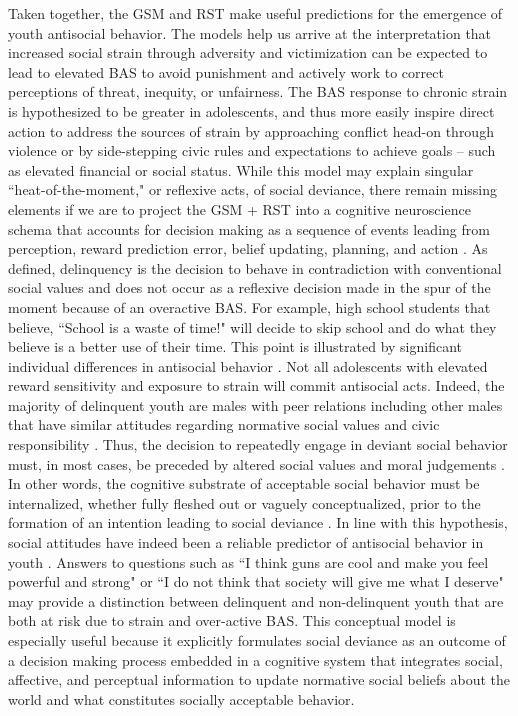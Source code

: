 \documentclass[utf8]{article}
\begin{document}
Taken together, the GSM and RST make useful predictions for the emergence of youth antisocial behavior. The models help us arrive at the interpretation that increased social strain through adversity and victimization can be expected to lead to elevated BAS to avoid punishment and actively work to correct perceptions of threat, inequity, or unfairness. The BAS response to chronic strain is hypothesized to be greater in adolescents, and thus more easily inspire direct action to address the sources of strain by approaching conflict head-on through violence or by side-stepping civic rules and expectations to achieve goals -- such as elevated financial or social status. While this model may explain singular  ``heat-of-the-moment," or reflexive acts, of social deviance, there remain missing elements if we are to project the GSM + RST into a cognitive neuroscience schema that accounts for decision making as a sequence of events leading from perception, reward prediction error, belief updating, planning, and action \citep{cosmides1997dissecting,cosmides2000socialreason,van2010interpersonal}. As defined, delinquency is the decision to behave in contradiction with conventional social values and does not occur as a reflexive decision made in the spur of the moment because of an overactive BAS. For example, high school students that believe, ``School is a waste of time!" will decide to skip school and do what they believe is a better use of their time. This point is illustrated by significant individual differences in antisocial behavior \citep{mazerolle1998gender}. Not all adolescents with elevated reward sensitivity and exposure to strain will commit antisocial acts. Indeed, the majority of delinquent youth are males with peer relations including other males that have similar attitudes regarding normative social values and civic responsibility \citep{mears1998explaining}. Thus, the decision to repeatedly engage in deviant social behavior must, in most cases, be preceded by altered social values and moral judgements \citep{stams2006moral}. In other words, the cognitive substrate of acceptable social behavior must be internalized, whether fully fleshed out or vaguely conceptualized, prior to the formation of an intention leading to social deviance \citep{pogarsky2018offender}. In line with this hypothesis, social attitudes have indeed been a reliable predictor of antisocial behavior in youth \citep{tarry2007attitudes}. Answers to questions such as ``I think guns are cool and make you feel powerful and strong" or ``I do not think that society will give me what I deserve" may provide a distinction between delinquent and non-delinquent youth that are both at risk due to strain and over-active BAS. This conceptual model is especially useful because it explicitly formulates social deviance as an outcome of a decision making process embedded in a cognitive system that integrates social, affective, and perceptual information to update normative social beliefs about the world and what constitutes socially acceptable behavior.
\end{document}
